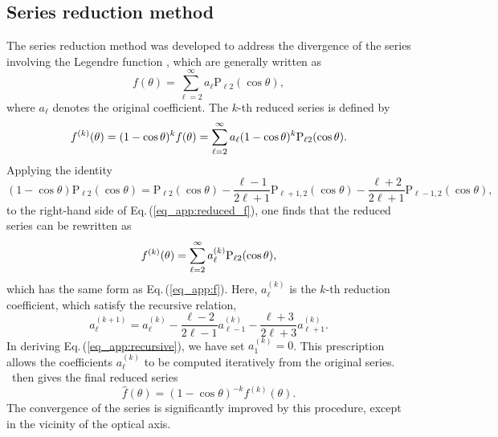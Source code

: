 \documentclass[reprint,amsmath,amssymb,aps,prd]{revtex4-2}
\begin{document}
\begin{widetext}
\section{\label{app:series_reduction_method}Series reduction method}
The series reduction method was developed to address the divergence of the series involving the Legendre function \cite{Yennie_1954,Stratton_2020}, which are generally written as
\begin{equation}
\label{eq_app:f}
f(\theta)=\sum_{\ell=2}^{\infty}
a_{\ell}\mathrm{P}_{\ell2}(\cos\theta),
\end{equation}
where $a_{\ell}$ denotes the original coefficient. The $k$-th reduced series is defined by
\begin{equation}
\label{eq_app:reduced_f}
f^{(k)}(\theta)
=(1-\cos\theta)^{k}f(\theta)
=\sum_{\ell=2}^{\infty}a_{\ell}(1-\cos\theta)^{k}{\rm P}_{\ell2}(\cos\theta).
\end{equation}
Applying the identity
\begin{equation}
(1-\cos\theta)\mathrm{P}_{\ell2}(\cos\theta)=\mathrm{P}_{\ell2}(\cos\theta)-\frac{\ell-1}{2\ell+1}\mathrm{P}_{\ell+1,2}(\cos\theta)-\frac{\ell+2}{2\ell+1}\mathrm{P}_{\ell-1,2}(\cos\theta),
\end{equation}
to the right-hand side of Eq.\,(\ref{eq_app:reduced_f}), one finds that the reduced series can be rewritten as
\begin{equation}
f^{(k)}(\theta)
=\sum_{\ell=2}^{\infty}a^{(k)}_{\ell}{\rm P}_{\ell2}(\cos\theta),
\end{equation}
which has the same form as Eq.\,(\ref{eq_app:f}). Here,  $a^{(k)}_{\ell}$ is the $k$-th reduction coefficient, which satisfy the recursive relation,
\begin{equation}
\label{eq_app:recursive}
a^{(k+1)}_{\ell}
=a^{(k)}_{\ell}
-\frac{\ell-2}{2\ell-1}a^{(k)}_{\ell-1}
-\frac{\ell+3}{2\ell+3}a^{(k)}_{\ell+1}.
\end{equation}
In deriving Eq.\,(\ref{eq_app:recursive}), we have set $a^{(k)}_{1}=0$. This prescription allows the coefficients $a^{(k)}_{\ell}$ to be computed iteratively from the original series. \ then gives the final reduced series 
\begin{equation}
\widehat{f}(\theta)=(1-\cos\theta)^{-k}f^{(k)}(\theta).
\end{equation}
The convergence of the series is significantly improved by this procedure, except in the vicinity of the optical axis.


\end{widetext}
\end{document}
